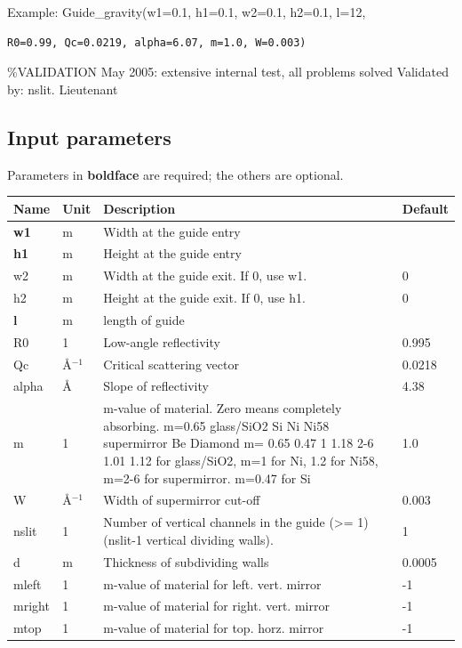 Example: Guide\_gravity(w1=0.1, h1=0.1, w2=0.1, h2=0.1, l=12,

\begin{verbatim}
R0=0.99, Qc=0.0219, alpha=6.07, m=1.0, W=0.003)
\end{verbatim}

\%VALIDATION May 2005: extensive internal test, all problems solved Validated by: nslit. Lieutenant

\subsection*{Input parameters}
Parameters in \textbf{boldface} are required; the others are optional.

\begin{longtable}{p{}p{}p{}p{}}
\toprule
\textbf{Name} & \textbf{Unit} & \textbf{Description} & \textbf{Default} \\
\midrule
\endhead
\textbf{w1} & m & Width at the guide entry &  \\
\textbf{h1} & m & Height at the guide entry &  \\
w2 & m & Width at the guide exit. If 0, use w1. & 0 \\
h2 & m & Height at the guide exit. If 0, use h1. & 0 \\
\textbf{l} & m & length of guide &  \\
R0 & 1 & Low-angle reflectivity & 0.995 \\
Qc & \AA{}$^{-1}$ & Critical scattering vector & 0.0218 \\
alpha & \AA{} & Slope of reflectivity & 4.38 \\
m & 1 & m-value of material. Zero means completely absorbing. m=0.65  glass/SiO2 Si   Ni  Ni58  supermirror Be    Diamond m=  0.65       0.47 1   1.18  2-6         1.01  1.12 for glass/SiO2, m=1 for Ni, 1.2 for Ni58, m=2-6 for supermirror. m=0.47 for Si & 1.0 \\
W & \AA{}$^{-1}$ & Width of supermirror cut-off & 0.003 \\
nslit & 1 & Number of vertical channels in the guide (\textgreater{}= 1) (nslit-1 vertical dividing walls). & 1 \\
d & m & Thickness of subdividing walls & 0.0005 \\
mleft & 1 & m-value of material for left.   vert. mirror & -1 \\
mright & 1 & m-value of material for right.  vert. mirror & -1 \\
mtop & 1 & m-value of material for top.    horz. mirror & -1 \\

\end{longtable}
